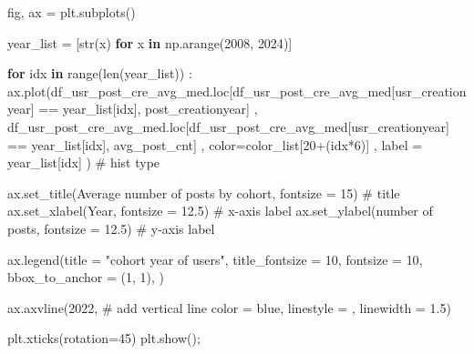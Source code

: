 \documentclass[
  letterpaper,
  DIV=11,
  numbers=noendperiod]{scrartcl}
\newenvironment{Shaded}{\begin{snugshade}}{\end{snugshade}}
\newcommand{\BuiltInTok}[1]{\textcolor[rgb]{0.00,0.23,0.31}{#1}}
\newcommand{\CommentTok}[1]{\textcolor[rgb]{0.37,0.37,0.37}{#1}}
\newcommand{\ControlFlowTok}[1]{\textcolor[rgb]{0.00,0.23,0.31}{\textbf{#1}}}
\newcommand{\DecValTok}[1]{\textcolor[rgb]{0.68,0.00,0.00}{#1}}
\newcommand{\FloatTok}[1]{\textcolor[rgb]{0.68,0.00,0.00}{#1}}
\newcommand{\KeywordTok}[1]{\textcolor[rgb]{0.00,0.23,0.31}{\textbf{#1}}}
\newcommand{\NormalTok}[1]{\textcolor[rgb]{0.00,0.23,0.31}{#1}}
\newcommand{\OperatorTok}[1]{\textcolor[rgb]{0.37,0.37,0.37}{#1}}
\newcommand{\StringTok}[1]{\textcolor[rgb]{0.13,0.47,0.30}{#1}}
\begin{document}
\begin{Shaded}
\begin{Highlighting}[]
\NormalTok{fig, ax }\OperatorTok{=}\NormalTok{ plt.subplots()}

\NormalTok{year\_list }\OperatorTok{=}\NormalTok{ [}\BuiltInTok{str}\NormalTok{(x) }\ControlFlowTok{for}\NormalTok{ x }\KeywordTok{in}\NormalTok{ np.arange(}\DecValTok{2008}\NormalTok{, }\DecValTok{2024}\NormalTok{)]}

\ControlFlowTok{for}\NormalTok{ idx }\KeywordTok{in} \BuiltInTok{range}\NormalTok{(}\BuiltInTok{len}\NormalTok{(year\_list)) :}
\NormalTok{  ax.plot(df\_usr\_post\_cre\_avg\_med.loc[df\_usr\_post\_cre\_avg\_med[}\StringTok{\textquotesingle{}usr\_creationyear\textquotesingle{}}\NormalTok{] }\OperatorTok{==}\NormalTok{ year\_list[idx], }\StringTok{\textquotesingle{}post\_creationyear\textquotesingle{}}\NormalTok{]}
\NormalTok{      ,  df\_usr\_post\_cre\_avg\_med.loc[df\_usr\_post\_cre\_avg\_med[}\StringTok{\textquotesingle{}usr\_creationyear\textquotesingle{}}\NormalTok{] }\OperatorTok{==}\NormalTok{ year\_list[idx], }\StringTok{\textquotesingle{}avg\_post\_cnt\textquotesingle{}}\NormalTok{]}
\NormalTok{      ,  color}\OperatorTok{=}\NormalTok{color\_list[}\DecValTok{20}\OperatorTok{+}\NormalTok{(idx}\OperatorTok{*}\DecValTok{6}\NormalTok{)]}
\NormalTok{      , label }\OperatorTok{=}\NormalTok{ year\_list[idx]}
\NormalTok{        ) }\CommentTok{\# hist type}


\NormalTok{ax.set\_title(}\StringTok{\textquotesingle{}Average number of posts by cohort\textquotesingle{}}\NormalTok{, fontsize }\OperatorTok{=} \DecValTok{15}\NormalTok{) }\CommentTok{\# title}
\NormalTok{ax.set\_xlabel(}\StringTok{\textquotesingle{}Year\textquotesingle{}}\NormalTok{, fontsize }\OperatorTok{=} \FloatTok{12.5}\NormalTok{) }\CommentTok{\# x{-}axis label}
\NormalTok{ax.set\_ylabel(}\StringTok{\textquotesingle{}number of posts\textquotesingle{}}\NormalTok{, fontsize }\OperatorTok{=} \FloatTok{12.5}\NormalTok{) }\CommentTok{\# y{-}axis label}

\NormalTok{ax.legend(title }\OperatorTok{=} \StringTok{"cohort year of users"}\NormalTok{,}
\NormalTok{          title\_fontsize }\OperatorTok{=} \DecValTok{10}\NormalTok{, fontsize }\OperatorTok{=} \DecValTok{10}\NormalTok{,}
\NormalTok{          bbox\_to\_anchor }\OperatorTok{=}\NormalTok{ (}\DecValTok{1}\NormalTok{, }\DecValTok{1}\NormalTok{), }
\NormalTok{          )}

\NormalTok{ax.axvline(}\StringTok{\textquotesingle{}2022\textquotesingle{}}\NormalTok{, }\CommentTok{\# add vertical line}
\NormalTok{           color }\OperatorTok{=} \StringTok{\textquotesingle{}blue\textquotesingle{}}\NormalTok{,}
\NormalTok{           linestyle }\OperatorTok{=} \StringTok{\textquotesingle{}{-}{-}\textquotesingle{}}\NormalTok{,}
\NormalTok{           linewidth }\OperatorTok{=} \FloatTok{1.5}\NormalTok{)}


\NormalTok{plt.xticks(rotation}\OperatorTok{=}\DecValTok{45}\NormalTok{)}
\NormalTok{plt.show()}\OperatorTok{;}
\end{Highlighting}
\end{Shaded}
\end{document}
